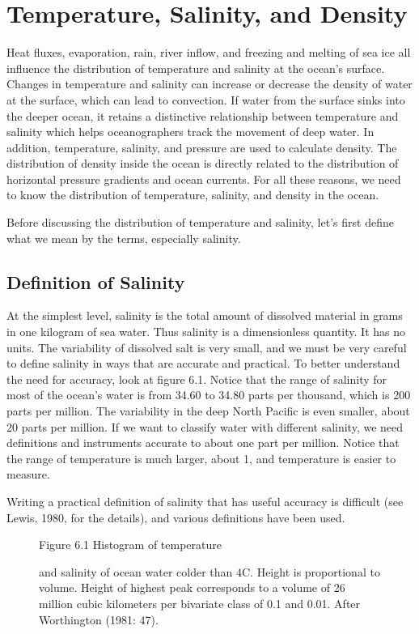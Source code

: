 \chapter{Temperature, Salinity, and Density}
Heat fluxes, evaporation, rain, river inflow, and freezing and melting of sea
ice all influence the distribution of temperature and salinity at the ocean's
surface. Changes in temperature and salinity can increase or decrease the density
of water at the surface, which can lead to convection. If water from the
surface sinks into the deeper ocean, it retains a distinctive relationship between
temperature and salinity which helps oceanographers track the movement of deep
water. In addition, temperature, salinity, and pressure are used to calculate
density. The distribution of density inside the ocean is directly related to the
distribution of horizontal pressure gradients and ocean currents.  For all these
reasons, we need to know the distribution of temperature, salinity, and density in
the ocean.

Before discussing the distribution of temperature and salinity, let's first define
what we mean by the terms, especially salinity.

\section{Definition of Salinity}
At the simplest level, salinity is the total amount of dissolved material in grams in one kilogram of sea water. Thus salinity is a dimensionless quantity. It has no units. The variability of dissolved salt is very small, and we must be very careful to define salinity in ways that are accurate and practical. To better understand the need for accuracy, look at figure
6.1. Notice that the range of salinity for most of the ocean's water is from 34.60 to 34.80 parts per thousand, which is 200 parts per million. The variability in the deep North Pacific is even smaller, about 20 parts per million. If we want to classify water with different salinity, we need definitions and instruments accurate to about one part per million. Notice that the range of temperature is much larger, about 1, and temperature is easier to measure.

Writing a practical definition of salinity that has useful accuracy is difficult (see Lewis, 1980, for the details), and various definitions have been used.\\

\begin{figure}[t!]
\footnotesize
Figure 6.1 Histogram of temperature \rule{0mm}{3ex}and salinity of ocean water colder than 4\degrees C. Height is proportional to
volume. Height of highest peak corresponds to a volume of 26 million cubic kilometers per bivariate class of 0.1 and 0.01. After Worthington (1981: 47).
\label{fig:salhistogram}
\vspace{-3ex}
\end{figure}

